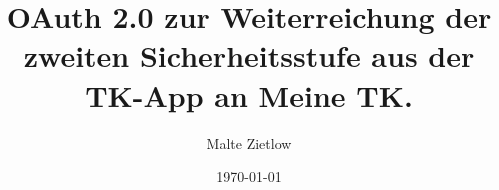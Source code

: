 \documentclass[12pt,twoside,bind,ams,a4paper]{hepthesis}
\author{Malte Zietlow}
\title{OAuth 2.0 zur Weiterreichung der zweiten Sicherheitsstufe aus der TK-App
an Meine TK.}
\date{\today}
\begin{document}
\renewcommand*\chapterheadstartvskip{\vspace*{-2cm}}
\renewcommand*{\figurename}{Abb.}
\renewcommand*{\figureautorefname}{Abb.}
\renewcommand*{\tablename}{Tab.}
\renewcommand*{\tableautorefname}{Tab.}
\renewcommand*{\chapterautorefname}{Kapitel}
\renewcommand*{\sectionautorefname}{Kapitel}
\renewcommand*{\subsectionautorefname}{Kapitel}
\renewcommand*{\equationautorefname}{Gl.}

\begin{frontmatter}

\end{frontmatter}
\setlength{\evensidemargin}{0.6cm}			%
\setlength{\oddsidemargin}{0.6cm}			%
\begin{mainmatter}

\end{mainmatter}

\begin{appendices}

\end{appendices}

\begin{backmatter}

\end{backmatter}
\end{document}
